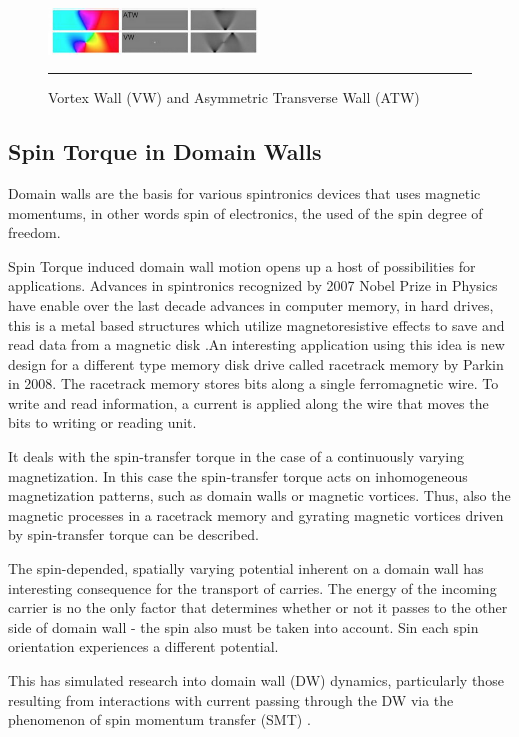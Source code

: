 \begin{figure}[htbp]
	\centering
		\includegraphics[width=0.5\textwidth]{Figures/dw.png}
		\rule{35em}{0.5pt}
	\caption[Domain Wall VW, ATW]{Vortex Wall (VW) and Asymmetric Transverse Wall (ATW)}
	\label{fig:dw}
\end{figure}

\subsection{Spin Torque in Domain Walls}

Domain walls are the basis for various spintronics devices that uses magnetic momentums, in other words spin of electronics, the used of the spin degree of freedom. 

Spin Torque induced domain wall motion opens up a host of possibilities for applications. Advances in spintronics recognized by 2007 Nobel Prize in Physics have enable over the last decade advances in computer memory, in hard drives, this is a metal based structures which utilize magnetoresistive effects to save and read data from a magnetic disk \cite{handbookspin}.An interesting application using this idea is new design for a different type memory disk drive called racetrack memory by Parkin in 2008\cite{racetrack}. The racetrack memory stores bits along a single ferromagnetic wire. To write and read information, a current is applied along the wire that moves the bits to writing or reading unit.

It deals with the spin-transfer torque in the case of a continuously varying magnetization. In this case the spin-transfer torque acts on inhomogeneous magnetization patterns, such as domain walls or magnetic vortices. Thus, also the magnetic processes in a racetrack memory and gyrating magnetic vortices driven by spin-transfer torque  can be described.

The spin-depended, spatially varying potential inherent on a domain wall has interesting consequence for the transport of carries. The energy of the incoming  carrier is no the only factor that determines whether or not it passes to the other side of domain wall - the spin also must be taken into account. Sin each spin orientation experiences a different potential.

This has simulated research into domain wall (DW) dynamics, particularly those resulting from interactions with current passing through the DW via the phenomenon of spin momentum transfer (SMT) \cite{handbookspin}.
 
